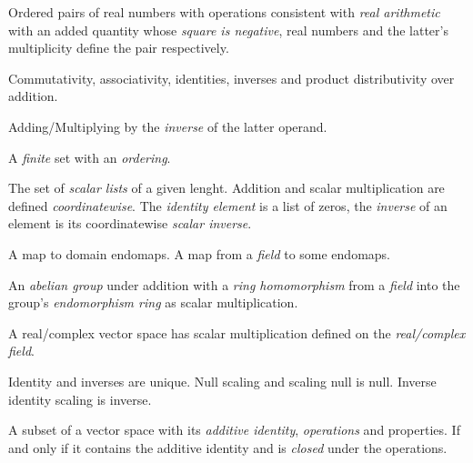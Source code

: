 

\usepackage[english]{babel}



\begin{multicols}{3}

  Ordered pairs of real numbers with operations consistent with \textit{real arithmetic}
  with an added quantity whose \textit{square is negative}, real numbers and the latter's
  multiplicity define the pair respectively.

  Commutativity, associativity, identities, inverses and product distributivity over addition.

  Adding/Multiplying by the \textit{inverse} of the latter operand.

  A \textit{finite} set with an \textit{ordering}.

  The set of \textit{scalar lists} of a given lenght.
  Addition and scalar multiplication are defined \textit{coordinatewise}.
  The \textit{identity element} is a list of zeros, the \textit{inverse}
  of an element is its coordinatewise \textit{scalar inverse}.

  A map to domain endomaps.
  A map from a \textit{field} to some endomaps.

  An \textit{abelian group} under addition with a \textit{ring homomorphism} from a \textit{field} into the group's \textit{endomorphism ring} as scalar multiplication.

  A real/complex vector space has scalar multiplication defined on the \textit{real/complex field}.

  Identity and inverses are unique. Null scaling and scaling null is null. Inverse identity scaling is inverse.

  A subset of a vector space with its \textit{additive identity}, \textit{operations} and properties.
  If and only if it contains the additive identity and is \textit{closed} under the operations.


\end{multicols}

